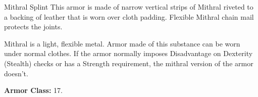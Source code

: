 \documentclass{dnd-deck}
\begin{document}
\begin{Card}{Mithral Splint}
  This armor is made of narrow vertical strips of Mithral riveted to a backing
  of leather that is worn over cloth padding. Flexible Mithral chain mail
  protects the joints.

  Mithral is a light, flexible metal. Armor made of this substance can be worn
  under normal clothes. If the armor normally imposes Disadvantage on Dexterity
  (Stealth) checks or has a Strength requirement, the mithral version of the
  armor doesn't.

  \textbf{Armor Class:} 17.
\end{Card}

\SpellCards

\MonsterAbberantSpirit
\MonsterFeySpirit

\Placard
\end{document}
